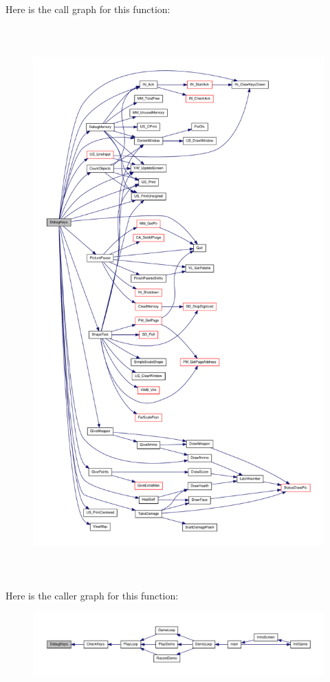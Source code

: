 Here is the call graph for this function:
\nopagebreak
\begin{figure}[H]
\begin{center}
\leavevmode
\includegraphics[height=600pt]{WL__DEF_8H_ae61234b6d03ca70ebed1f5a423d17ba5_cgraph}
\end{center}
\end{figure}




Here is the caller graph for this function:
\nopagebreak
\begin{figure}[H]
\begin{center}
\leavevmode
\includegraphics[width=400pt]{WL__DEF_8H_ae61234b6d03ca70ebed1f5a423d17ba5_icgraph}
\end{center}
\end{figure}


